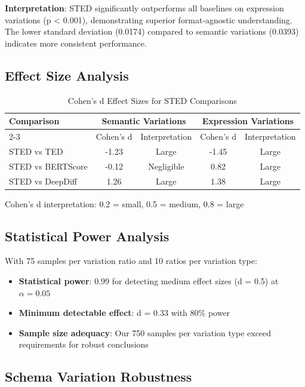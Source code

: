 \documentclass{article}
\begin{document}
\textbf{Interpretation}: STED significantly outperforms all baselines on expression variations (p < 0.001), demonstrating superior format-agnostic understanding. The lower standard deviation (0.0174) compared to semantic variations (0.0393) indicates more consistent performance.

\subsection{Effect Size Analysis}

\begin{table}[H]
\centering
\caption{Cohen's d Effect Sizes for STED Comparisons}
\label{tab:effect-sizes}
\begin{tabular}{lcccc}
\toprule
\textbf{Comparison} & \multicolumn{2}{c}{\textbf{Semantic Variations}} & \multicolumn{2}{c}{\textbf{Expression Variations}} \\
\cmidrule{2-3} \cmidrule{4-5}
& Cohen's d & Interpretation & Cohen's d & Interpretation \\
\midrule
STED vs TED & -1.23 & Large & -1.45 & Large \\
STED vs BERTScore & -0.12 & Negligible & 0.82 & Large \\
STED vs DeepDiff & 1.26 & Large & 1.38 & Large \\
\bottomrule
\end{tabular}
\vspace{0.3em}
\small{Cohen's d interpretation: 0.2 = small, 0.5 = medium, 0.8 = large}
\end{table}

\subsection{Statistical Power Analysis}

With 75 samples per variation ratio and 10 ratios per variation type:
\begin{itemize}
\item \textbf{Statistical power}: 0.99 for detecting medium effect sizes (d = 0.5) at $\alpha = 0.05$
\item \textbf{Minimum detectable effect}: d = 0.33 with 80\% power
\item \textbf{Sample size adequacy}: Our 750 samples per variation type exceed requirements for robust conclusions
\end{itemize}

\subsection{Schema Variation Robustness}
\end{document}

